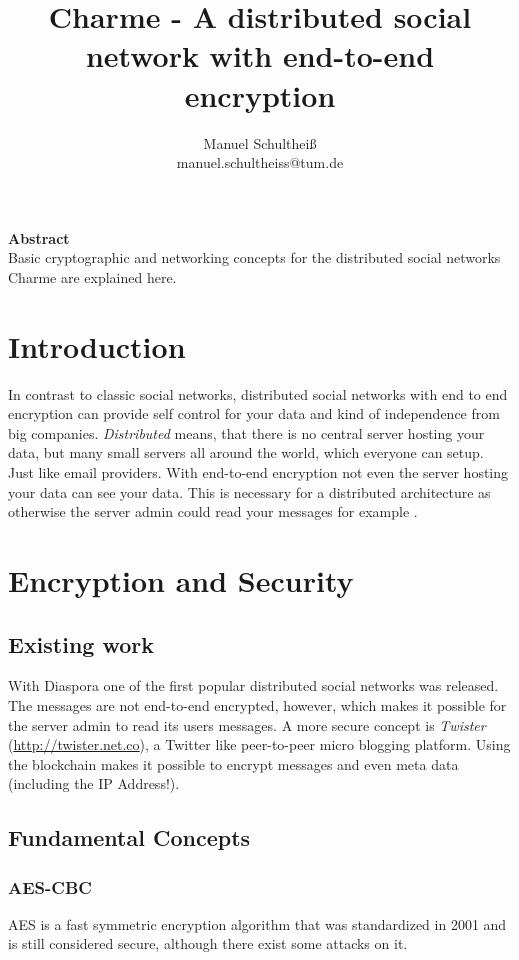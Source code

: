 \documentclass{scrartcl}
\title{Charme - A distributed social network with end-to-end encryption}
\author{Manuel Schultheiß\\manuel.schultheiss@tum.de}
\begin{document}
  \sloppy %
 
\maketitle
\textbf{Abstract}\\
Basic cryptographic and networking concepts for the distributed social networks Charme are explained here.

\tableofcontents
 \newpage



\section{Introduction}
In contrast to classic social networks, distributed social networks with end to end encryption can provide self control for your data and kind of independence from big companies.  \textit{Distributed} means, that there is no central server hosting your data, but many small servers all around the world, which everyone can  setup. Just like email providers. With end-to-end encryption not even the server hosting your data can see your data. This is necessary for a distributed architecture as otherwise the server admin could read your messages for example .

 \section{Encryption and Security}
 \subsection{Existing work}
With Diaspora one of the first popular distributed social networks was released. The messages are not end-to-end encrypted, however, which makes it possible for the server admin to read its users messages. 
A more secure concept is \textit{Twister} (\url{http://twister.net.co}), a Twitter like peer-to-peer micro blogging platform. Using the blockchain makes it possible to encrypt messages and even meta data (including the IP Address!).
\subsection{Fundamental Concepts}
\subsubsection{AES-CBC \label{AESCBC}}
AES is a fast symmetric encryption algorithm that was standardized in 2001 and is still considered secure, although there exist some attacks on it.
\end{document}
